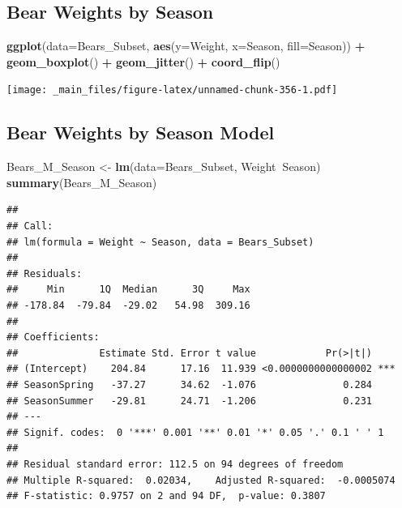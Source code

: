\documentclass[]{book}
\newenvironment{Shaded}{\begin{snugshade}}{\end{snugshade}}
\newcommand{\KeywordTok}[1]{\textcolor[rgb]{0.13,0.29,0.53}{\textbf{#1}}}
\newcommand{\DataTypeTok}[1]{\textcolor[rgb]{0.13,0.29,0.53}{#1}}
\newcommand{\StringTok}[1]{\textcolor[rgb]{0.31,0.60,0.02}{#1}}
\newcommand{\OperatorTok}[1]{\textcolor[rgb]{0.81,0.36,0.00}{\textbf{#1}}}
\newcommand{\NormalTok}[1]{#1}
\begin{document}
\subsection{Bear Weights by Season}\label{bear-weights-by-season}

\begin{Shaded}
\begin{Highlighting}[]
\KeywordTok{ggplot}\NormalTok{(}\DataTypeTok{data=}\NormalTok{Bears_Subset, }\KeywordTok{aes}\NormalTok{(}\DataTypeTok{y=}\NormalTok{Weight, }\DataTypeTok{x=}\NormalTok{Season, }\DataTypeTok{fill=}\NormalTok{Season)) }\OperatorTok{+}\StringTok{ }
\StringTok{   }\KeywordTok{geom_boxplot}\NormalTok{() }\OperatorTok{+}\StringTok{ }\KeywordTok{geom_jitter}\NormalTok{() }\OperatorTok{+}\StringTok{ }\KeywordTok{coord_flip}\NormalTok{()}
\end{Highlighting}
\end{Shaded}

\texttt{[image: \_main\_files/figure-latex/unnamed-chunk-356-1.pdf]}

\subsection{Bear Weights by Season
Model}\label{bear-weights-by-season-model}

\begin{Shaded}
\begin{Highlighting}[]
\NormalTok{Bears_M_Season <-}\StringTok{ }\KeywordTok{lm}\NormalTok{(}\DataTypeTok{data=}\NormalTok{Bears_Subset, Weight}\OperatorTok{~}\NormalTok{Season)}
\KeywordTok{summary}\NormalTok{(Bears_M_Season)}
\end{Highlighting}
\end{Shaded}

\begin{verbatim}
## 
## Call:
## lm(formula = Weight ~ Season, data = Bears_Subset)
## 
## Residuals:
##     Min      1Q  Median      3Q     Max 
## -178.84  -79.84  -29.02   54.98  309.16 
## 
## Coefficients:
##              Estimate Std. Error t value            Pr(>|t|)    
## (Intercept)    204.84      17.16  11.939 <0.0000000000000002 ***
## SeasonSpring   -37.27      34.62  -1.076               0.284    
## SeasonSummer   -29.81      24.71  -1.206               0.231    
## ---
## Signif. codes:  0 '***' 0.001 '**' 0.01 '*' 0.05 '.' 0.1 ' ' 1
## 
## Residual standard error: 112.5 on 94 degrees of freedom
## Multiple R-squared:  0.02034,    Adjusted R-squared:  -0.0005074 
## F-statistic: 0.9757 on 2 and 94 DF,  p-value: 0.3807
\end{verbatim}
\end{document}
